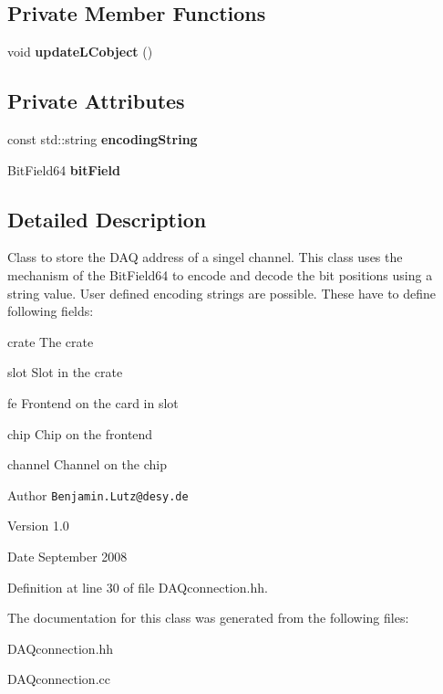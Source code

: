 \subsection*{Private Member Functions}
\begin{DoxyCompactItemize}
\item 
void {\bfseries updateLCobject} ()\label{classCALICE_1_1DAQconnection_a99cde9fbe145d08c6e60ce5946b28814}

\end{DoxyCompactItemize}
\subsection*{Private Attributes}
\begin{DoxyCompactItemize}
\item 
const std::string {\bfseries encodingString}\label{classCALICE_1_1DAQconnection_ae7c2fbe117b63706706a28ac96610975}

\item 
BitField64 {\bfseries bitField}\label{classCALICE_1_1DAQconnection_a98f14d4db56868cecb7b286546a7fe0e}

\end{DoxyCompactItemize}


\subsection{Detailed Description}
Class to store the DAQ address of a singel channel. This class uses the mechanism of the BitField64 to encode and decode the bit positions using a string value. User defined encoding strings are possible. These have to define following fields: \begin{DoxyItemize}
\item crate The crate \item slot Slot in the crate \item fe Frontend on the card in slot \item chip Chip on the frontend \item channel Channel on the chip\end{DoxyItemize}
\begin{DoxyAuthor}{Author}
{\tt Benjamin.Lutz@desy.de} 
\end{DoxyAuthor}
\begin{DoxyVersion}{Version}
1.0 
\end{DoxyVersion}
\begin{DoxyDate}{Date}
September 2008 
\end{DoxyDate}


Definition at line 30 of file DAQconnection.hh.

The documentation for this class was generated from the following files:\begin{DoxyCompactItemize}
\item 
DAQconnection.hh\item 
DAQconnection.cc\end{DoxyCompactItemize}
